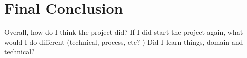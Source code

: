 \section{Final Conclusion}
Overall, how do I think the project did?
If I did start the project again, what would I do different (technical, process, etc? )
Did I learn things, domain and technical?





